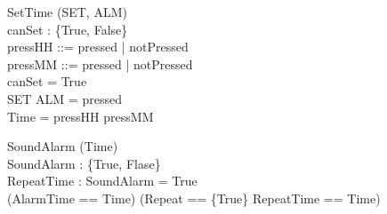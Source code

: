 \documentclass[Main_Assignment2]{subfiles}
\begin{document}
\begin{schema}{SetTime} %
\Delta (SET, ALM) \\
canSet : \{True, False\} \\
pressHH ::= pressed | notPressed \\
pressMM ::= pressed | notPressed \\
\where
canSet = True \Rightarrow \\
\hspace{20pt} SET \wedge ALM = pressed \\
Time = pressHH \cup pressMM \\
\end{schema}

\begin{schema}{SoundAlarm}
\Delta (Time) \\
SoundAlarm : \{True, Flase\} \\
RepeatTime : 
\where
SoundAlarm = True \Rightarrow \\
\hspace{20pt} (AlarmTime == Time) \vee (Repeat == \{True\} \wedge RepeatTime == Time)
\end{schema}
\end{document}
